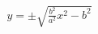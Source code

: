 \documentclass[preview]{standalone}
\begin{document}
\begin{align*}
y = \pm\sqrt{\frac{b^2}{a^2}x^2 - b^2}
\end{align*}
\end{document}
